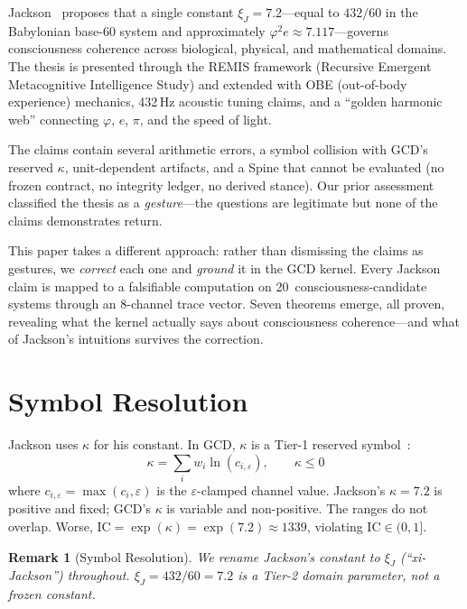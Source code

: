 \documentclass[
  aps,
  prd,
  twocolumn,
  superscriptaddress,
  nofootinbib,
  floatfix
]{revtex4-2}
\newtheorem{remark}{Remark}
\newcommand{\eps}{\varepsilon}
\newcommand{\beq}{\begin{equation}}
\newcommand{\eeq}{\end{equation}}
\newcommand{\IC}{\mathrm{IC}}
\newcommand{\xiJ}{\xi_J}
\begin{document}
Jackson~\cite{jackson2026earth,jackson2026curved} proposes that a single
constant $\xiJ = 7.2$---equal to $432/60$ in the Babylonian base-60
system and approximately $\varphi^2 e \approx 7.117$---governs
consciousness coherence across biological, physical, and mathematical
domains.  The thesis is presented through the REMIS framework (Recursive
Emergent Metacognitive Intelligence Study) and extended with OBE (out-of-body
experience) mechanics, 432\,Hz acoustic tuning claims, and a ``golden
harmonic web'' connecting $\varphi$, $e$, $\pi$, and the speed of light.

The claims contain several arithmetic errors, a symbol collision with GCD's
reserved $\kappa$, unit-dependent artifacts, and a Spine that cannot be
evaluated (no frozen contract, no integrity ledger, no derived stance).
Our prior assessment classified the thesis as a \emph{gesture}---the
questions are legitimate but none of the claims demonstrates return.

This paper takes a different approach: rather than dismissing the claims as
gestures, we \emph{correct} each one and \emph{ground} it in the GCD
kernel.  Every Jackson claim is mapped to a falsifiable computation on
20~consciousness-candidate systems through an 8-channel trace vector.
Seven theorems emerge, all proven, revealing what the kernel actually says
about consciousness coherence---and what of Jackson's intuitions survives
the correction.

\section{Symbol Resolution}
\label{sec:symbols}

Jackson uses $\kappa$ for his constant.  In GCD, $\kappa$ is a Tier-1
reserved symbol~\cite{paulus2025umcp}:
\beq
  \kappa = \sum_i w_i \ln(c_{i,\eps}), \qquad \kappa \leq 0
\eeq
where $c_{i,\eps} = \max(c_i, \eps)$ is the $\eps$-clamped channel value.
Jackson's $\kappa = 7.2$ is positive and fixed; GCD's $\kappa$ is variable
and non-positive.  The ranges do not overlap.  Worse,
$\IC = \exp(\kappa) = \exp(7.2) \approx 1339$, violating $\IC \in (0,1]$.

\begin{remark}[Symbol Resolution]
We rename Jackson's constant to $\xiJ$ (``xi-Jackson'') throughout.
$\xiJ = 432/60 = 7.2$ is a Tier-2 domain parameter, not a frozen constant.
\end{remark}
\end{document}
